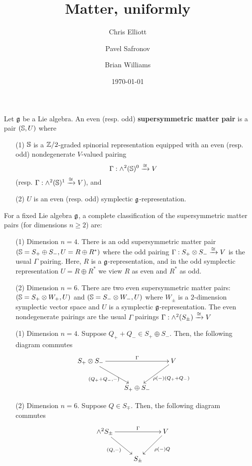 \documentclass[10pt, oneside]{article}
\title{Matter, uniformly}
\author{Chris Elliott\and Pavel Safronov \and Brian Williams}
\date{\today}
\begin{document}
\maketitle

\begin{definition}
Let $\mathfrak g$ be a Lie algebra.
An even (resp. odd) {\bf supersymmetric matter pair} is a pair $(\mathbb S, U)$ where 
\begin{itemize}
\item[(1)] $\mathbb S$ is a $\mathbb Z/2$-graded spinorial representation equipped with an even (resp. odd) nondegenerate $V$-valued pairing
\[
\Gamma : \wedge^2(\mathbb S)^0 \xrightarrow{\cong} V
\]
(resp. $\Gamma : \wedge^2(\mathbb S)^1 \xrightarrow{\cong} V$), and

\item[(2)] $U$ is an even (resp. odd) symplectic $\mathfrak g$-representation.
\end{itemize}
\end{definition}

\begin{lem}
For a fixed Lie algebra $\mathfrak g$, a complete classification of the supersymmetric matter pairs  (for dimensions $n \geq 2$) are:
\begin{itemize}
\item[(1)] Dimension $n = 4$. 
There is an odd supersymmetric matter pair $(\mathbb S = S_+ \oplus S_-, U = R \oplus R^*)$ where the odd pairing $\Gamma : S_+ \otimes S_- \xrightarrow{\cong} V$ is the usual $\Gamma$ pairing. Here, $R$ is a $\mathfrak g$-representation, and in the odd symplectic representation $U = R \oplus R^*$ we view $R$ as even and $R^*$ as odd. 
\item[(2)] Dimension $n=6$.
There are two even supersymmetric matter pairs: $(\mathbb S = S_+ \otimes W_+, U)$ and $(\mathbb S = S_- \otimes W_-, U)$ where $W_\pm$ is a $2$-dimension symplectic vector space and $U$ is a symplectic $\mathfrak g$-representation. 
The even nondegenerate pairings are the usual $\Gamma$ pairings $\Gamma : \wedge^2 (S_\pm) \xrightarrow{\cong} V$ 
\end{itemize}
\end{lem}


\begin{prop}

\begin{itemize}
\item[(1)] Dimension $n = 4$.
Suppose $Q_+ + Q_- \in S_+ \oplus S_-$.
Then, the following diagram commutes
\[
\xymatrix{
S_+ \otimes S_- \ar[dr]_-{(Q_+ + Q_-,-)} \ar[rr]^-{\Gamma} & & V \ar[dl]^-{\rho(-)(Q_+ + Q_-)} \\
& S_+ \oplus S_- &  
}
\]
\item[(2)] Dimension $n = 6$. 
Suppose $Q \in S_\mp$.
Then, the following diagram commutes
\[
\xymatrix{
\wedge^2 S_\pm \ar[dr]_-{(Q,-)} \ar[rr]^-{\Gamma} & & V \ar[dl]^-{\rho(-)Q} \\
& S_\pm & 
}
\]
\end{itemize}
\end{prop}
\end{document}
